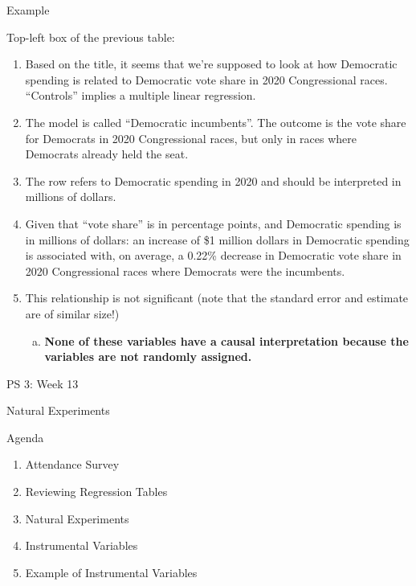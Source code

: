 \documentclass[
  11pt,
  ignorenonframetext,
]{beamer}
\providecommand{\tightlist}{%
  \setlength{\itemsep}{0pt}\setlength{\parskip}{0pt}}
\begin{document}
\begin{frame}{Example}
\protect{}\label{example}
\small

Top-left box of the previous table:

\begin{enumerate}
\tightlist
\item
  Based on the title, it seems that we're supposed to look at how
  Democratic spending is related to Democratic vote share in 2020
  Congressional races. ``Controls'' implies a multiple linear
  regression. \pause
\item
  The model is called ``Democratic incumbents''. The outcome is the vote
  share for Democrats in 2020 Congressional races, but only in races
  where Democrats already held the seat. \pause
\item
  The row refers to Democratic spending in 2020 and should be
  interpreted in millions of dollars. \pause
\item
  Given that ``vote share'' is in percentage points, and Democratic
  spending is in millions of dollars: an increase of \$1 million dollars
  in Democratic spending is associated with, on average, a 0.22\%
  decrease in Democratic vote share in 2020 Congressional races where
  Democrats were the incumbents. \pause
\item
  This relationship is not significant (note that the standard error and
  estimate are of similar size!) \pause

  \begin{enumerate}
  [a.]
  \tightlist
  \item
    \textbf{None of these variables have a causal interpretation because
    the variables are not randomly assigned.}
  \end{enumerate}
\end{enumerate}

\normalsize
\end{frame}

\begin{frame}{PS 3: Week 13}
\protect{}\label{ps-3-week-13}
\vspace{1.2cm}
\begin{center}
\Large Natural Experiments
\end{center}
\end{frame}

\begin{frame}{Agenda}
\protect{}\label{agenda-1}
\begin{enumerate}
\tightlist
\item
  Attendance Survey
\item
  Reviewing Regression Tables
\item
  Natural Experiments
\item
  Instrumental Variables
\item
  Example of Instrumental Variables
\end{enumerate}
\end{frame}
\end{document}

